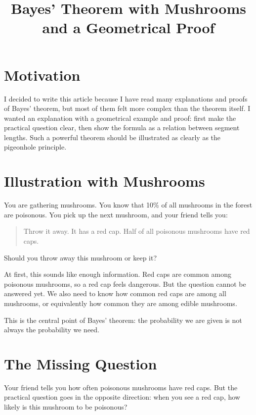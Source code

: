 \documentclass[11pt]{article}
\title{Bayes' Theorem with Mushrooms and a Geometrical Proof}
\author{}
\date{}
\begin{document}
\maketitle
\thispagestyle{plain}

\section*{Motivation}

I decided to write this article because I have read many explanations and proofs of Bayes' theorem, but most of them felt more complex than the theorem itself. I wanted an explanation with a geometrical example and proof: first make the practical question clear, then show the formula as a relation between segment lengths. Such a powerful theorem should be illustrated as clearly as the pigeonhole principle.

\section*{Illustration with Mushrooms}

You are gathering mushrooms. You know that 10\% of all mushrooms in the forest are poisonous. You pick up the next mushroom, and your friend tells you:

\begin{quote}
Throw it away. It has a red cap. Half of all poisonous mushrooms have red caps.
\end{quote}

Should you throw away this mushroom or keep it?

At first, this sounds like enough information. Red caps are common among poisonous mushrooms, so a red cap feels dangerous. But the question cannot be answered yet. We also need to know how common red caps are among all mushrooms, or equivalently how common they are among edible mushrooms.

This is the central point of Bayes' theorem: the probability we are given is not always the probability we need.

\section*{The Missing Question}

Your friend tells you how often poisonous mushrooms have red caps. But the practical question goes in the opposite direction: when you see a red cap, how likely is this mushroom to be poisonous?
\end{document}
